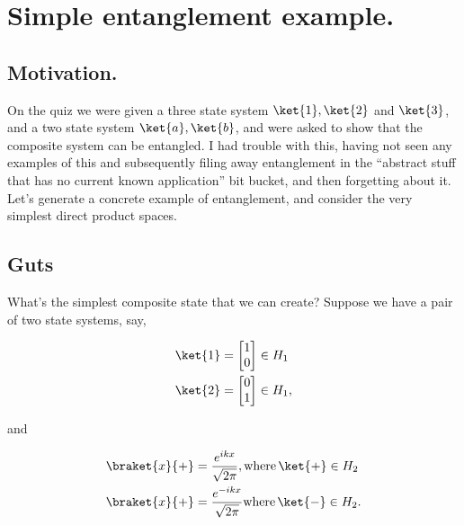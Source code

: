 
%

\chapter{Simple entanglement example.}
\label{chap:entangledSimpleExample}
{}
\date{Oct 9, 2011}

\beginArtWithToc

\section{Motivation.}

On the quiz we were given a three state system $\ket{1}, \ket{2}$ and $\ket{3}$, and a two state system $\ket{a}, \ket{b}$, and were asked to show that the composite system can be entangled.  I had trouble with this, having not seen any examples of this and subsequently filing away entanglement in the ``abstract stuff that has no current known application'' bit bucket, and then forgetting about it.  Let's generate a concrete example of entanglement, and consider the very simplest direct product spaces.

\section{Guts}

What's the simplest composite state that we can create?  Suppose we have a pair of two state systems, say,

\begin{align}\label{eqn:entangledSimpleExample:n}
\ket{1} 
&= 
\begin{bmatrix}
1 \\
0
\end{bmatrix} \in H_1 \\
\ket{2} 
&= 
\begin{bmatrix}
0 \\
1 
\end{bmatrix} \in H_1,
\end{align}

and

\begin{align}\label{eqn:entangledSimpleExample:n}
\braket{x}{+} 
&= 
\frac{e^{i k x}}{\sqrt{2\pi}},
\text{where}\, \ket{+} \in H_2 \\
\braket{x}{+} 
&= 
\frac{e^{-i k x}}{\sqrt{2\pi}}
\text{where}\, \ket{-} \in H_2.
\end{align}

